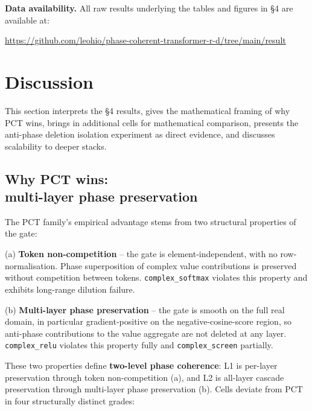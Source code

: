 \documentclass[11pt,a4paper]{article}
\theoremstyle{plain}
\theoremstyle{definition}
\begin{document}
\textbf{Data availability.} All raw results underlying the tables and figures in \S{}4 are available at:

\url{https://github.com/leohio/phase-coherent-transformer-r-d/tree/main/result}

\medskip

\section{Discussion}
This section interprets the \S{}4 results, gives the mathematical framing of why PCT wins, brings in additional cells for mathematical comparison, presents the anti-phase deletion isolation experiment as direct evidence, and discusses scalability to deeper stacks.

\subsection{Why PCT wins:\\ multi-layer phase preservation}
The PCT family's empirical advantage stems from two structural properties of the gate:

(a) \textbf{Token non-competition} -- the gate is element-independent, with no row-normalisation. Phase superposition of complex value contributions is preserved without competition between tokens. \texttt{complex\_softmax} violates this property and exhibits long-range dilution failure.

(b) \textbf{Multi-layer phase preservation} -- the gate is smooth on the full real domain, in particular gradient-positive on the negative-cosine-score region, so anti-phase contributions to the value aggregate are not deleted at any layer. \texttt{complex\_relu} violates this property fully and \texttt{complex\_screen} partially.

These two properties define \textbf{two-level phase coherence}: L1 is per-layer preservation through token non-competition (a), and L2 is all-layer cascade preservation through multi-layer phase preservation (b). Cells deviate from PCT in four structurally distinct grades:
\end{document}
